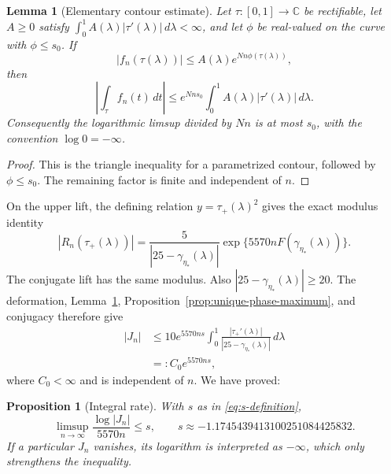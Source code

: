 \documentclass[11pt,reqno,letterpaper]{amsart}
\numberwithin{equation}{section}
\newtheorem{proposition}[theorem]{Proposition}
\newtheorem{lemma}[theorem]{Lemma}
\theoremstyle{definition}
\theoremstyle{remark}
\begin{document}
\begin{lemma}[Elementary contour estimate]\label{lem:elementary-contour-estimate}
Let \(\tau:[0,1]\to\mathbb C\) be rectifiable, let \(A\geq0\) satisfy
\(\int_0^1A(\lambda)|\tau'(\lambda)|\,d\lambda<\infty\), and let
\(\phi\) be real-valued on the curve with \(\phi\leq s_0\).  If
\[
 |f_n(\tau(\lambda))|\leq
 A(\lambda)e^{Nn\phi(\tau(\lambda))},
\]
then
\[
 \left|\int_\tau f_n(t)\,dt\right|
 \leq e^{Nns_0}\int_0^1
 A(\lambda)|\tau'(\lambda)|\,d\lambda.
\]
Consequently the logarithmic limsup divided by \(Nn\) is at most
\(s_0\), with the convention \(\log0=-\infty\).
\end{lemma}

\begin{proof}
This is the triangle inequality for a parametrized contour, followed by
\(\phi\leq s_0\).  The remaining factor is finite and independent of
\(n\).
\end{proof}

On the upper lift, the defining relation \(y=\tau_+(\lambda)^2\) gives
the exact modulus identity
\begin{equation}\label{eq:fixed-amplitude-identity}
 |R_n(\tau_+(\lambda))|
 =\frac5{|25-\gamma_{\eta_*}(\lambda)|}
 \exp\{5570nF(\gamma_{\eta_*}(\lambda))\}.
\end{equation}
The conjugate lift has the same modulus.  Also
\(|25-\gamma_{\eta_*}(\lambda)|\geq20\).  The deformation,
Lemma~\ref{lem:elementary-contour-estimate},
Proposition~\ref{prop:unique-phase-maximum}, and conjugacy therefore give
\begin{equation}\label{eq:fixed-amplitude-bound}
 \begin{split}
 |J_n|
 &\leq10e^{5570ns}\int_0^1
 \frac{|\tau_+'(\lambda)|}
 {|25-\gamma_{\eta_*}(\lambda)|}\,d\lambda\\
 &=:C_0e^{5570ns},
 \end{split}
\end{equation}
where \(C_0<\infty\) and is independent of \(n\).  We have proved:

\begin{proposition}[Integral rate]\label{prop:integral-rate}
With \(s\) as in \eqref{eq:s-definition},
\begin{equation}\label{eq:integral-limsup}
 \limsup_{n\to\infty}\frac{\log|J_n|}{5570n}
 \leq s,\qquad
 s\approx-1.1745439413100251084425832.
\end{equation}
If a particular \(J_n\) vanishes, its logarithm is interpreted as
\(-\infty\), which only strengthens the inequality.
\end{proposition}
\end{document}
